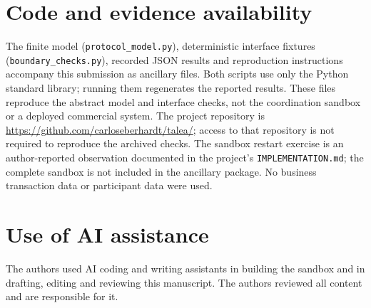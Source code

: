 \documentclass[10pt]{article}
\begin{document}
\section*{Code and evidence availability}
The finite model (\texttt{protocol\_model.py}), deterministic interface fixtures (\texttt{boundary\_checks.py}), recorded JSON results and reproduction instructions accompany this submission as ancillary files. Both scripts use only the Python standard library; running them regenerates the reported results. These files reproduce the abstract model and interface checks, not the coordination sandbox or a deployed commercial system. The project repository is \url{https://github.com/carloseberhardt/talea/}; access to that repository is not required to reproduce the archived checks. The sandbox restart exercise is an author-reported observation documented in the project's \texttt{IMPLEMENTATION.md}; the complete sandbox is not included in the ancillary package. No business transaction data or participant data were used.

\section*{Use of AI assistance}
The authors used AI coding and writing assistants in building the sandbox and in drafting, editing and reviewing this manuscript. The authors reviewed all content and are responsible for it.




\clearpage
\appendix

\end{document}
